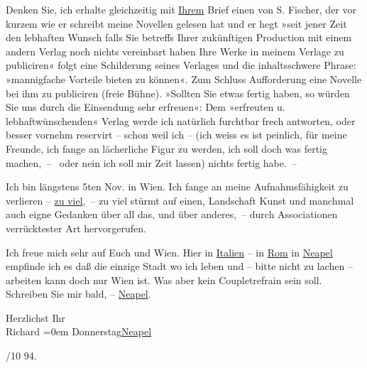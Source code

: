 \pstart
           Denken Sie, ich erhalte gleichzeitig mit \uline{Ihrem} Brief
               einen von S. Fischer, der vor kurzem wie er
               schreibt meine Novellen gelesen hat und er hegt »seit jener Zeit den lebhaften Wunsch
                  {\pb}falls Sie betreffs Ihrer
               zukünftigen Production mit einem andern Verlag noch nichts vereinbart haben Ihre
               Werke in meinem Verlage zu publiciren« folgt eine Schilderung seines Verlages und die
               inhaltsschwere Phrase: »mannigfache Vorteile bieten zu können«. Zum Schluss
               Aufforderung eine Novelle bei ihm zu publiciren (freie Bühne). »Sollten Sie {\pb}etwas fertig haben, so würden Sie uns durch die Einsendung sehr erfreuen«: Dem
               »erfreuten u. lebhaftwünschenden« Verlag werde ich natürlich furchtbar frech
               antworten, oder besser vornehm reservirt – schon weil ich – (ich weiss es ist
               peinlich, für meine Freunde, ich fange an lächerliche Figur zu werden, ich soll doch
               was fer{\pb}tig machen, –  oder nein
               ich soll mir Zeit lassen) nichts fertig habe. –\pend
           
\pstart
           Ich bin längstens 5ten Nov. in Wien.
               Ich fange an meine Aufnahmsfähigkeit zu verlieren – \uline{zu
                  viel}, – zu viel stürmt auf einen, Landschaft Kunst und manchmal {\pb}auch eigne Gedanken über all das,
               und über anderes, – durch Associationen verrücktester Art hervorgerufen.\pend
           
\pstart
           Ich freue mich sehr auf Euch und Wien. Hier in \uline{Italien} – in \uline{Rom} in \uline{Neapel} empfinde ich es daß die einzige Stadt wo ich leben {\pb}und – bitte nicht zu lachen –
               arbeiten kann doch nur Wien ist. Was aber kein
               Coupletrefrain sein soll. Schreiben Sie mir bald, – \uline{Neapel}.\pend
           
\pstart
           Herzlichst Ihr{\\[\baselineskip]}\spacefill\mbox{Richard}\pend
           \leftskip=0em{}
\pstart
           Donnerstag\hspace*{1.5em}\uline{Neapel}\pend
           
/10 94.\pend
           \endnumbering{}  
      